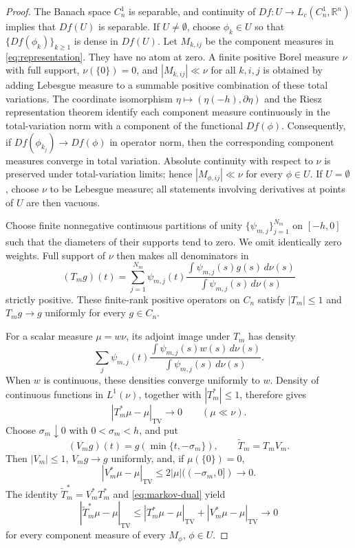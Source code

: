\documentclass[11pt]{article}
\newcommand{\Lc}{L_c}
\newcommand{\TV}{\mathrm{TV}}
\begin{document}
\begin{proof}
The Banach space $C_n^1$ is separable, and continuity of
$Df:U\to\Lc(C_n^1,\mathbb R^n)$ implies that $Df(U)$ is separable.
If $U\ne\emptyset$, choose $\phi_k\in U$ so that
$\{Df(\phi_k)\}_{k\ge1}$ is dense in $Df(U)$.
Let $M_{k,ij}$ be the component measures in \eqref{eq:representation}.
They have no atom at zero. A finite positive Borel measure $\nu$
with full support, $\nu(\{0\})=0$, and $|M_{k,ij}|\ll\nu$
for all $k,i,j$ is obtained by adding Lebesgue measure to a
summable positive combination of these total variations.
The coordinate isomorphism
$\eta\mapsto(\eta(-h),\partial\eta)$ and the Riesz
representation theorem identify each component measure continuously
in the total-variation norm with a component of the functional
$Df(\phi)$. Consequently, if $Df(\phi_{k_j})\to Df(\phi)$
in operator norm, then the corresponding component measures converge
in total variation. Absolute continuity with respect to $\nu$
is preserved under total-variation limits; hence
$|M_{\phi,ij}|\ll\nu$ for every $\phi\in U$.
If $U=\emptyset$, choose $\nu$ to be Lebesgue measure; all
statements involving derivatives at points of $U$ are then vacuous.

Choose finite nonnegative continuous partitions of unity $\{\psi_{m,j}\}_{j=1}^{N_m}$ on $[-h,0]$ such that the diameters of their supports tend to zero. We omit identically zero weights. Full support of $\nu$ then makes all denominators in
\begin{equation}\label{eq:markov}
 (T_mg)(t)=\sum_{j=1}^{N_m}\psi_{m,j}(t)
 \frac{\int\psi_{m,j}(s)g(s)\,d\nu(s)}{\int\psi_{m,j}(s)\,d\nu(s)}
\end{equation}
strictly positive. These finite-rank positive operators on $C_n$ satisfy $|T_m|\le1$ and $T_mg\to g$ uniformly for every $g\in C_n$.

For a scalar measure $\mu=w\nu$, its adjoint image under $T_m$ has density
\[
 \sum_j\psi_{m,j}(t)
 \frac{\int\psi_{m,j}(s)w(s)\,d\nu(s)}{\int\psi_{m,j}(s)\,d\nu(s)}.
\]
When $w$ is continuous, these densities converge uniformly to $w$. Density of continuous functions in $L^1(\nu)$, together with $|T_m^*|\le1$, therefore gives
\begin{equation}\label{eq:markov-dual}
 |T_m^*\mu-\mu|_{\TV}\longrightarrow0
 \qquad(\mu\ll\nu).
\end{equation}
Choose $\sigma_m\downarrow0$ with $0<\sigma_m<h$, and put
\[
 (V_mg)(t)=g(\min\{t,-\sigma_m\}),\qquad \widetilde T_m=T_mV_m.
\]
Then $|V_m|\le1$, $V_mg\to g$ uniformly, and, if $\mu(\{0\})=0$,
\[
 |V_m^*\mu-\mu|_{\TV}
 \le2|\mu|((-\sigma_m,0])\longrightarrow0.
\]
The identity $\widetilde T_m^*=V_m^*T_m^*$ and \eqref{eq:markov-dual} yield
\begin{equation}\label{eq:composed-dual}
 |\widetilde T_m^*\mu-\mu|_{\TV}
 \le|T_m^*\mu-\mu|_{\TV}+|V_m^*\mu-\mu|_{\TV}
 \longrightarrow0
\end{equation}
for every component measure of every $M_\phi$, $\phi\in U$.


\end{proof}
\end{document}
